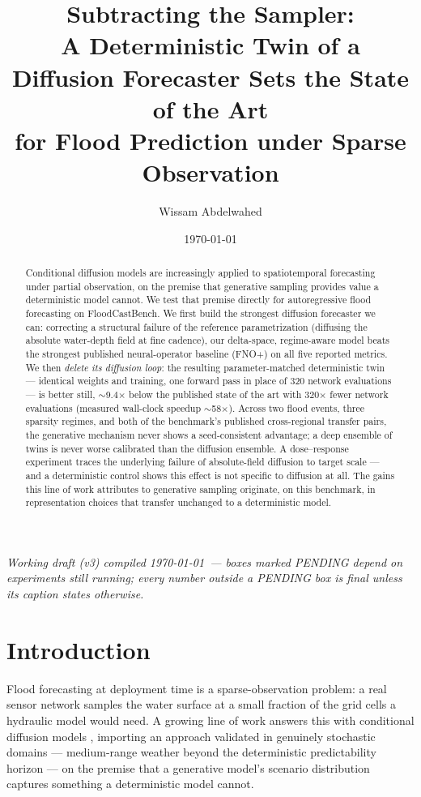 \documentclass[11pt]{article}
\title{\textbf{Subtracting the Sampler: \\
  \large A Deterministic Twin of a Diffusion Forecaster Sets the State of
  the Art \\ for Flood Prediction under Sparse Observation}}
\author{Wissam Abdelwahed}
\date{\today}
\newcommand{\readynote}[1]{%
  {\small\color{gray}\textit{#1}}
}
\begin{document}
\maketitle

\begin{abstract}
\noindent
Conditional diffusion models are increasingly applied to spatiotemporal
forecasting under partial observation, on the premise that generative
sampling provides value a deterministic model cannot. We test that
premise directly for autoregressive flood forecasting on FloodCastBench.
We first build the strongest diffusion forecaster we can: correcting a
structural failure of the reference parametrization (diffusing the
absolute water-depth field at fine cadence), our delta-space, regime-aware
model beats the strongest published neural-operator baseline (FNO+) on
all five reported metrics. We then \emph{delete its diffusion loop}: the
resulting parameter-matched deterministic twin --- identical weights and
training, one forward pass in place of 320 network evaluations --- is
better still, $\sim$9.4$\times$ below the published state of the art with
320$\times$ fewer network evaluations (measured wall-clock speedup
$\sim$58$\times$). Across two flood events, three sparsity
regimes, and both of the benchmark's published cross-regional transfer
pairs, the generative mechanism never shows a seed-consistent advantage;
a deep ensemble of twins is never worse calibrated than the diffusion
ensemble. A dose--response experiment traces the underlying failure of
absolute-field diffusion to target scale --- and a deterministic control
shows this effect is not specific to diffusion at all. The gains this
line of work attributes to generative sampling originate, on this
benchmark, in representation choices that transfer unchanged to a
deterministic model.
\end{abstract}

\begin{center}
\readynote{Working draft (v3) compiled \today\ --- boxes marked PENDING
depend on experiments still running; every number outside a PENDING box
is final unless its caption states otherwise.}
\end{center}

\section{Introduction}
\label{sec:intro}

Flood forecasting at deployment time is a sparse-observation problem: a
real sensor network samples the water surface at a small fraction of the
grid cells a hydraulic model would need. A growing line of work answers
this with conditional diffusion models
\citep{diffsparse2025,jamesstations2025,jamesocean2025,phyda2025},
importing an approach validated in genuinely stochastic domains ---
medium-range weather beyond the deterministic predictability horizon
\citep{gencast2024} --- on the premise that a generative model's scenario
distribution captures something a deterministic model cannot.
\end{document}
